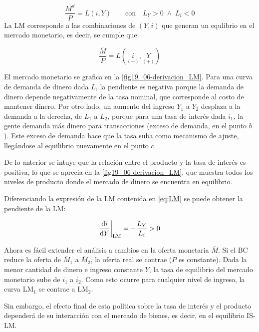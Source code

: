 \documentclass[DeGregorioResumen]{subfiles}
\begin{document}
\begin{equation}
\frac{M^d}{P}=L(i,Y) \qquad \text{con} \quad  L_Y>0 \;\wedge\; L_i<0
\label{eq:LM}
\end{equation}
La LM corresponde a las combinaciones de $(Y,i)$ que generan un equlibrio en el mercado monetario, es decir, se cumple que:

\begin{equation}
\frac{\overline{M}}{P} = L(\underset{(-)}{i},\underset{(+)}{Y})
\label{eq:LM}
\end{equation}

El mercado monetario se grafica en la \autoref{fig19_06-derivacion_LM}. Para una curva de demanda de dinero dada $L$, la pendiente es negativa porque la demanda de dinero depende negativamente de la tasa nominal, que corresponde al costo de mantener dinero. Por otro lado, un aumento del ingreso $Y_1$ a $Y_2$ desplaza a la demanda a la derecha, de $L_1$ a $L_2$, porque para una tasa de interés dada $i_1$, la gente demanda más dinero para transacciones (exceso de demanda, en el punto $b$). Este exceso de demanda hace que la tasa suba como mecanismo de ajuste, llegándose al equilibrio nuevamente en el punto $c$.

De lo anterior se intuye que la relación entre el producto y la tasa de interés es positiva, lo que se aprecia en la \autoref{fig19_06-derivacion_LM}, que muestra todos los niveles de producto donde el mercado de dinero se encuentra en equilibrio.



Diferenciando la expresión de la LM contenida en \eqref{eq:LM} se puede obtener la pendiente de la LM:

\begin{equation}
\frac{\mathrm{d}i}{\mathrm{d}Y} \bigg |_{\text{LM}} = -\frac{L_Y}{L_i} > 0
\end{equation}

Ahora es fácil extender el análisis a cambios en la oferta monetaria $\overline{M}$. Si el BC reduce la oferta de $\overline{M}_1$ a $\overline{M}_2$, la oferta real se contrae ($P$ es constante). Dada la menor cantidad de dinero e ingreso constante $Y$, la tasa de equilibrio del mercado monetario sube de $i_1$ a $i_2$. Como esto ocurre para cualquier nivel de ingreso, la curva LM$_1$ se contrae a LM$_2$.



Sin embargo, el efecto final de esta política sobre la tasa de interés y el producto dependerá de su interacción con el mercado de bienes, es decir, en el equilibrio IS-LM.
\end{document}
